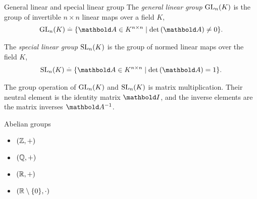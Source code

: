 \begin{ex}{General linear and special linear group}{}
The \emph{general linear group} $\mathrm{GL}_{n}(K)$ is the group of invertible ${n \times n}$ linear maps over a field $K$, \begin{align}
    \GL{n}{K} \defeq \{\mA \in K^{n \times n} \mid \determ{\mA} \neq 0\}.
\end{align}

The \emph{special linear group} $\mathrm{SL}_{n}(K)$ is the group of normed linear maps over the field $K$, \begin{align}
    \SL{n}{K} \defeq \{\mA \in K^{n \times n} \mid \determ{\mA} = 1\}.
\end{align}

The group operation of $\mathrm{GL}_{n}(K)$ and $\mathrm{SL}_{n}(K)$ is matrix multiplication. Their neutral element is the identity matrix $\mI$, and the inverse elements are the matrix inverses $\inv{\mA}$.
\end{ex}

\begin{ex}{Abelian groups}{}
\begin{itemize}
    \item $(\mathbb{Z},+)$
    \item $(\mathbb{Q},+)$
    \item $(\mathbb{R},+)$
    \item $(\mathbb{R} \setminus \{0\},\cdot)$
\end{itemize}
\end{ex}

